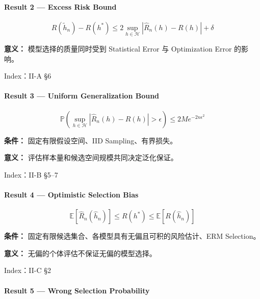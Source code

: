 \hypertarget{part-2-27-0001-result-2-excess-risk-bound}{%
\paragraph{Result 2 --- Excess Risk Bound}\label{part-2-27-0001-result-2-excess-risk-bound}}

\[\boxed{
R(\tilde h_n)-R(h^*)
\leq
2\sup_{h\in\mathcal H}
|\widehat R_n(h)-R(h)|+\delta
}\]

\textbf{意义：} 模型选择的质量同时受到 Statistical Error 与 Optimization Error 的影响。

Index：II-A §6

\hypertarget{part-2-27-0001-result-3-uniform-generalization-bound}{%
\paragraph{Result 3 --- Uniform Generalization Bound}\label{part-2-27-0001-result-3-uniform-generalization-bound}}

\[\boxed{
\mathbb P
\left(
\sup_{h\in\mathcal H}
|\widehat R_n(h)-R(h)|>\epsilon
\right)
\leq2Me^{-2n\epsilon^2}
}\]

\textbf{条件：} 固定有限假设空间、IID Sampling、有界损失。

\textbf{意义：} 评估样本量和候选空间规模共同决定泛化保证。

Index：II-B §5--7

\hypertarget{part-2-27-0001-result-4-optimistic-selection-bias}{%
\paragraph{Result 4 --- Optimistic Selection Bias}\label{part-2-27-0001-result-4-optimistic-selection-bias}}

\[\boxed{
\mathbb E[\widehat R_n(\hat h_n)]
\leq R(h^*)
\leq\mathbb E[R(\hat h_n)]
}\]

\textbf{条件：} 固定有限候选集合、各模型具有无偏且可积的风险估计、ERM Selection。

\textbf{意义：} 无偏的个体评估不保证无偏的模型选择。

Index：II-C §2

\hypertarget{part-2-27-0001-result-5-wrong-selection-probability}{%
\paragraph{Result 5 --- Wrong Selection Probability}\label{part-2-27-0001-result-5-wrong-selection-probability}}

